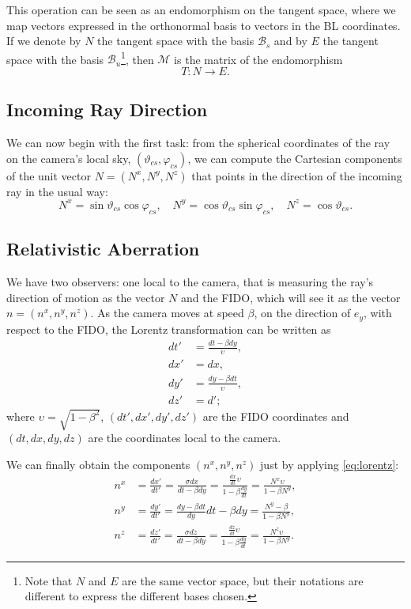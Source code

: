 This operation can be seen as an endomorphism on the tangent space, where we map vectors expressed in the orthonormal basis to vectors in the \ac{BL} coordinates. If we denote by $N$ the tangent space with the basis $\mathcal{B}_s$ and by $E$ the tangent space with the basis $\mathcal{B}_u$\footnote{Note that $N$ and $E$ are the same vector space, but their notations are different to express the different bases chosen.}, then $\mathcal{M}$ is the matrix of the endomorphism \[T \colon N \to E.\]

\subsection{Incoming Ray Direction}

We can now begin with the first task: from the spherical coordinates of the ray on the camera's local sky, $(\vartheta_{cs}, \varphi_{cs})$, we can compute the Cartesian components of the unit vector $N = (N^x, N^y, N^z)$ that points in the direction of the incoming ray in the usual way:
\begin{equation}
	N^x = \sin\vartheta_{cs} \cos\varphi_{cs}, \quad N^y = \cos\vartheta_{cs} \sin\varphi_{cs}, \quad N^z = \cos\vartheta_{cs}.
\end{equation}

\subsection{Relativistic Aberration}

We have two observers: one local to the camera, that is measuring the ray's direction of motion as the vector $N$ and the \ac{FIDO}, which will see it as the vector $n = (n^x, n^y, n^z)$. As the camera moves at speed $\beta$, on the direction of $e_y$, with respect to the \ac{FIDO}, the Lorentz transformation can be written as
\begin{align}
	\label{eq:lorentz}
	dt' &= \frac{dt - \beta dy}{\upsilon}, \\ \nonumber
	dx' &= dx, \\ \nonumber
	dy' &= \frac{dy - \beta dt}{\upsilon}, \\ \nonumber
	dz' &= d';
\end{align}
where $\upsilon = \sqrt{1 - \beta^2}$, $(dt', dx', dy', dz')$ are the \ac{FIDO} coordinates and $(dt, dx, dy, dz)$ are the coordinates local to the camera.

We can finally obtain the components $(n^x, n^y, n^z)$ just by applying \autoref{eq:lorentz}:
\begin{align*}
	n^x &= \frac{dx'}{dt'} = \frac{\sigma dx}{dt - \beta dy} = \frac{\frac{dx}{dt} \upsilon}{1 - \beta \frac{dy}{dt}} = \frac{N^x \upsilon}{1 - \beta N^y}, \\
	n^y &= \frac{dy'}{dt'} = \frac{dy - \beta dt}{dy}{dt - \beta dy} = \frac{N^y - \beta}{1 - \beta N^y}, \\
	n^z &= \frac{dz'}{dt'} = \frac{\sigma dz}{dt - \beta dy} = \frac{\frac{dz}{dt} \upsilon}{1 - \beta \frac{dy}{dt}} = \frac{N^z \upsilon}{1 - \beta N^y}.
\end{align*}

